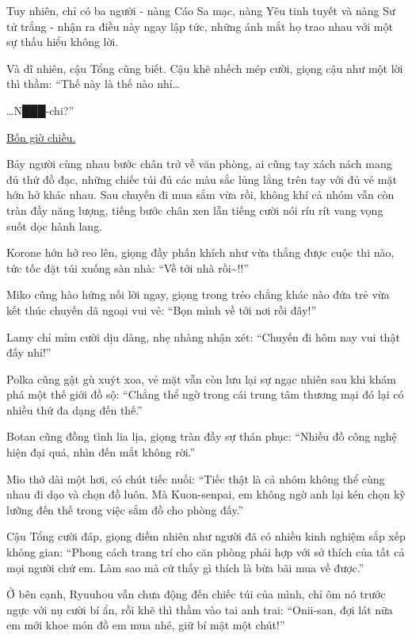 \documentclass[../main.tex]{subfiles}
\begin{document}
Tuy nhiên, chỉ có ba người - nàng Cáo Sa mạc, nàng Yêu tinh tuyết và nàng Sư tử trắng - nhận ra điều này ngay lập tức, những ánh mắt họ trao nhau với một sự thấu hiểu không lời.

Và dĩ nhiên, cậu Tổng cũng biết. Cậu khẽ nhếch mép cười, giọng cậu như một lời thì thầm: ``Thế này là thế nào nhỉ\dots

\dots N███-chi?''

\ct

\begin{center}
  \uline{Bốn giờ chiều.}
\end{center}

Bảy người cùng nhau bước chân trở về văn phòng, ai cũng tay xách nách mang đủ thứ đồ đạc, những chiếc túi đủ các màu sắc lủng lẳng trên tay với đủ vẻ mặt hớn hở khác nhau. Sau chuyến đi mua sắm vừa rồi, không khí cả nhóm vẫn còn tràn đầy năng lượng, tiếng bước chân xen lẫn tiếng cười nói ríu rít vang vọng suốt dọc hành lang.

Korone hớn hở reo lên, giọng đầy phấn khích như vừa thắng được cuộc thi nào, tức tốc đặt túi xuống sàn nhà: ``Về tới nhà rồi\~{}!!''

Miko cũng hào hứng nối lời ngay, giọng trong trẻo chẳng khác nào đứa trẻ vừa kết thúc chuyến dã ngoại vui vẻ: ``Bọn mình về tới nơi rồi đây!''

Lamy chỉ mỉm cười dịu dàng, nhẹ nhàng nhận xét: ``Chuyến đi hôm nay vui thật đấy nhỉ!''

Polka cũng gật gù xuýt xoa, vẻ mặt vẫn còn lưu lại sự ngạc nhiên sau khi khám phá một thế giới đồ sộ: ``Chẳng thể ngờ trong cái trung tâm thương mại đó lại có nhiều thứ đa dạng đến thế.''

Botan cũng đồng tình lia lịa, giọng tràn đầy sự thán phục: ``Nhiều đồ công nghệ hiện đại quá, nhìn đến mắt không rời.''

Mio thở dài một hơi, có chút tiếc nuối: ``Tiếc thật là cả nhóm không thể cùng nhau đi dạo và chọn đồ luôn. Mà Kuon-senpai, em không ngờ anh lại kén chọn kỹ lưỡng đến thế trong việc sắm đồ cho phòng đấy.''

Cậu Tổng cười đáp, giọng điềm nhiên như người đã có nhiều kinh nghiệm sắp xếp không gian: ``Phong cách trang trí cho căn phòng phải hợp với sở thích của tất cả mọi người chứ em. Làm sao mà cứ thấy gì thích là bừa bãi mua về được.''

Ở bên cạnh, Ryuuhou vẫn chưa động đến chiếc túi của mình, chỉ ôm nó trước ngực với nụ cười bí ẩn, rồi khẽ thì thầm vào tai anh trai: ``Onii-san, đợi lát nữa em mới khoe món đồ em mua nhé, giữ bí mật một chút!''
\end{document}
